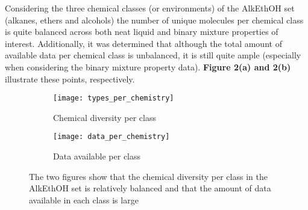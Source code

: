 \documentclass[rmp,nofootinbib,superscriptaddress,12pt,tightenlines,notitlepage]{revtex4-1}
\begin{document}
Considering the three chemical classes (or environments) of the AlkEthOH set (alkanes, ethers and alcohols) the number of unique molecules per chemical class is quite balanced 
across both neat liquid and binary mixture properties of interest. Additionally, it was determined that although the total amount of available data per chemical class is unbalanced, it is still quite ample (especially when considering the binary mixture property data). \textbf{Figure 2(a) and 2(b)} illustrate these
points, respectively.
\begin{figure}[h!]
\centering
\begin{subfigure}{.5\textwidth}
  \centering
  \texttt{[image: types\_per\_chemistry]}
  \caption{Chemical diversity per class}
  \label{fig:sub1}
\end{subfigure}%
\begin{subfigure}{.5\textwidth}
  \centering
  \texttt{[image: data\_per\_chemistry]}
  \caption{Data available per class}
  \label{fig:sub2}
\end{subfigure}
\caption{The two figures show that the chemical diversity per class in the AlkEthOH set is relatively balanced and that the amount of data available in each class is large}
\label{fig:test}
\end{figure}
\end{document}
